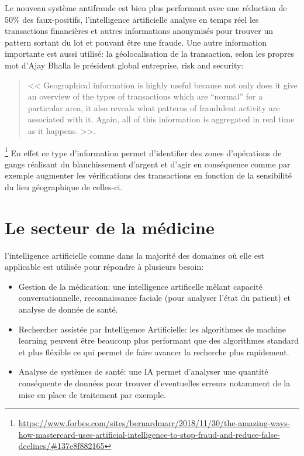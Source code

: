             Le nouveau système antifraude est bien plus performant avec une réduction 
            de 50\% des faux-positifs, l'intelligence artificielle analyse en temps réel 
            les transactions financières et autres informations anonymisés
            pour trouver un pattern sortant du lot et pouvant être une fraude. 
            Une autre information importante est aussi utilisé: la géolocalisation 
            de la transaction, selon les propres mot d'Ajay Bhalla le président 
            global entreprise, risk and security: 
            \begin{quote}
                << Geographical information is highly useful because 
                not only does it give an overview of the types of transactions which are “normal” 
                for a particular area, it also reveals what patterns of fraudulent activity 
                are associated with it. Again, all of this information is aggregated in real time 
                as it happens. >>.
            \end{quote}
            \footnote{\url{https://www.forbes.com/sites/bernardmarr/2018/11/30/the-amazing-ways-how-mastercard-uses-artificial-intelligence-to-stop-fraud-and-reduce-false-declines/\#137e8f882165}}
            En effet ce type d'information permet d'identifier des zones d'opérations de gangs réalisant du blanchissement 
            d'argent et d'agir en conséquence comme par exemple augmenter les vérifications des transactions en fonction
            de la sensibilité du lieu géographique de celles-ci. \newline


    \section{Le secteur de la médicine}
        l'intelligence artificielle comme dans la majorité des domaines où elle est applicable est utilisée
        pour répondre à plusieurs besoin:
        \begin{itemize}
            \item Gestion de la médication: une intelligence artificelle mêlant capacité conversationnelle,
            reconnaissance faciale (pour analyser l'état du patient) et analyse de donnée de santé. \newline
            \item Rechercher assistée par Intelligence Artificielle: les algorithmes de machine learning peuvent
            être beaucoup plus performant que des algorithmes standard et plus fléxible ce qui permet 
            de faire avancer la recherche plus rapidement. \newline 
            \item Analyse de systèmes de santé: une IA permet d'analyser une quantité conséquente de données 
            pour trouver d'eventuelles erreurs notamment de la mise en place de traitement par exemple.
        \end{itemize}

